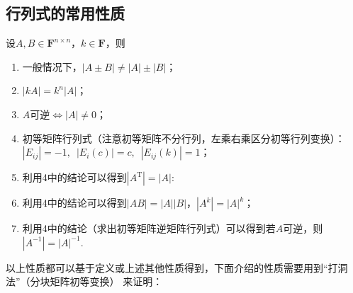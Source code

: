 \subsection{行列式的常用性质}
设$A,B \in \mathbf{F}^{n \times n}$，$k \in \mathbf{F}$，则
\begin{enumerate}
    \item 一般情况下，$|A \pm B| \neq |A|\pm|B|$；

    \item $|kA|=k^n|A|$；

    \item $A$可逆$\iff |A| \neq 0$；

    \item 初等矩阵行列式（注意初等矩阵不分行列，左乘右乘区分初等行列变换）：$|E_{ij}|=-1,\enspace |E_i(c)|=c,\enspace |E_{ij}(k)|=1$；

    \item 利用4中的结论可以得到$|A^\mathrm{T}|=|A|$:

    \item 利用4中的结论可以得到$|AB|=|A||B|$，$|A^k|=|A|^k$；

    \item 利用4中的结论（求出初等矩阵逆矩阵行列式）可以得到若$A$可逆，则$|A^{-1}|=|A|^{-1}$.
\end{enumerate}

以上性质都可以基于定义或上述其他性质得到，下面介绍的性质需要用到``打洞法''（分块矩阵初等变换）
来证明：

